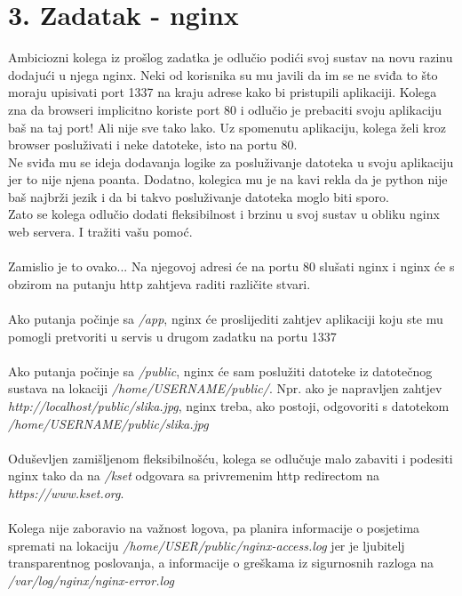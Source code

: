 \documentclass[12pt,a4paper]{article}
\begin{document}
\section*{3. Zadatak - nginx}

Ambiciozni kolega iz prošlog zadatka je odlučio podići svoj sustav na novu razinu dodajući u njega nginx.
Neki od korisnika su mu javili da im se ne sviđa to što moraju upisivati port 1337 na kraju adrese kako bi pristupili aplikaciji.
Kolega zna da browseri implicitno koriste port 80 i odlučio je prebaciti svoju aplikaciju baš na taj port! Ali nije sve tako lako.
Uz spomenutu aplikaciju, kolega želi kroz browser posluživati i neke datoteke, isto na portu 80. \\
Ne sviđa mu se ideja dodavanja logike za posluživanje datoteka u svoju aplikaciju jer to nije njena poanta.
Dodatno, kolegica mu je na kavi rekla da je python nije baš najbrži jezik i da bi takvo posluživanje datoteka moglo biti sporo.\\
Zato se kolega odlučio dodati fleksibilnost i brzinu u svoj sustav u obliku nginx web servera. I tražiti vašu pomoć. \\
\\
Zamislio je to ovako... Na njegovoj adresi će na portu 80 slušati nginx
i nginx će s obzirom na putanju http zahtjeva raditi različite stvari. \\
\\
Ako putanja počinje sa \textit{/app}, nginx će proslijediti zahtjev aplikaciji
koju ste mu pomogli pretvoriti u servis u drugom zadatku na portu 1337 \\
\\
Ako putanja počinje sa \textit{/public}, nginx će sam poslužiti datoteke iz datotečnog sustava na lokaciji \textit{/home/USERNAME/public/}.
Npr. ako je napravljen zahtjev \textit{http://localhost/public/slika.jpg}, nginx treba, ako postoji, odgovoriti s datotekom \textit{/home/USERNAME/public/slika.jpg} \\
\\
Oduševljen zamišljenom fleksibilnošću, kolega se odlučuje malo zabaviti i podesiti nginx
tako da na \textit{/kset} odgovara sa privremenim http redirectom na \textit{https://www.kset.org}. \\
\\
Kolega nije zaboravio na važnost logova, pa planira informacije o posjetima spremati na lokaciju
\textit{/home/USER/public/nginx-access.log} jer je ljubitelj transparentnog poslovanja,
a informacije o greškama iz sigurnosnih razloga na \textit{/var/log/nginx/nginx-error.log} \\
\\
\end{document}
